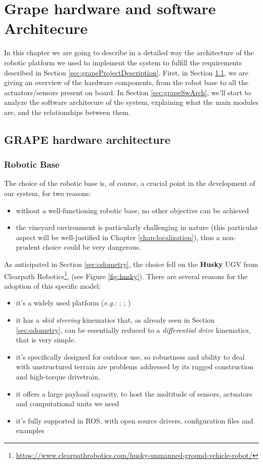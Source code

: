 
\chapter{Grape hardware and software Architecure} \label{chap:grapeSoftwareArchitecture}

In this chapter we are going to describe in a detailed way the architecture of the robotic platform we used to implement the system to fulfill the requirements described in Section \ref{sec:grapeProjectDescription}. First, in Section \ref{sec:grapeHwArch}, we are giving an overview of the hardware components, from the robot base to all the actuators/sensors present on board. In Section \ref{sec:grapeSwArch}, we'll start to analyze the software architecure of the system, explaining what the main modules are, and the relationships between them.

\section{GRAPE hardware architecture}\label{sec:grapeHwArch}

\subsection{Robotic Base}
The choice of the robotic base is, of course, a crucial point in the development of our system, for two reasons:
\begin{itemize}
	\item without a well-functioning robotic base, no other objective can be achieved
	\item the vineyard environment is particularly challenging in nature (this particular aspect will be well-justified in Chapter \ref{chap:localization}), thus a non-prudent choice could be very dangerous.
\end{itemize}
As anticipated in Section \ref{sec:odometry}, the choice fell on the \textbf{Husky} \ac{UGV} from Clearpath Robotics\footnote{\url{https://www.clearpathrobotics.com/husky-unmanned-ground-vehicle-robot/}},
(see Figure \ref{fig:husky}). There are several reasons for the adoption of this specific model:
\begin{itemize}
	\item it's a widely used platform (\textit{e.g.}: \cite{husky1}; \cite{husky2}; \cite{husky3})
	\item it has a \textit{skid steering} kinematics that, as already seen in Section \ref{sec:odometry}, can be essentially reduced to a \textit{differential drive} kinematics, that is very simple.
	\item it's specifically designed for outdoor use, so robustness and ability to deal with unstructured terrain are problems addressed by its rugged construction and high-torque drivetrain.
	\item it offers a large payload capacity, to host the moltitude of sensors, actuators and computational units we need
	\item it's fully supported in \ac{ROS}, with open source drivers, configuration files and examples
\end{itemize}

